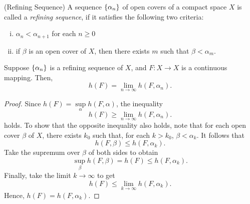 \documentclass[12pt,twoside,draft]{book}
\begin{document}
\begin{definition}
  (Refining Sequence)
  A sequence $\left \{ \alpha_n \right \}$ of open covers of a compact space $X$ is called a \textit{refining sequence}, if it satisfies the following two criteria:
  \begin{enumerate}[(i)]
    \item $\alpha_n < \alpha_{n+1}$ for each $n\geq 0$
    \item if $\beta$ is an open cover of $X$, then there exists $m$ such that $\beta < \alpha_m$.
  \end{enumerate}
\end{definition}

\begin{theorem}
  Suppose $\left \{ \alpha_n \right \}$ is a refining sequence of $X$, and $F:X\to X$ is a continuous mapping.
  Then,
  \begin{equation*}
    h(F) = \lim\limits_{n\to \infty} h(F, \alpha_n).
  \end{equation*}
  \label{thm:t-ent-ref-seq}
  \begin{proof}
    Since $h(F) = \sup\limits_{\alpha} h(F, \alpha)$, the inequality
    \begin{equation*}
      h(F) \geq \lim\limits_{n\to \infty} h(F, \alpha_n).
    \end{equation*}
    holds.
    To show that the opposite inequality also holds, note that for each open cover $\beta$ of $X$, there exists $k_0$ such that, for each $k > k_0$, $\beta < \alpha_k$.
    It follows that
    \begin{equation*}
      h(F, \beta) \leq h(F, \alpha_k).
    \end{equation*}
    Take the supremum over $\beta$ of both sides to obtain
    \begin{equation*}
      \sup\limits_{\beta} h(F, \beta) = h(F) \leq h(F, \alpha_k).
    \end{equation*}
    Finally, take the limit $k \to \infty$ to get
    \begin{equation*}
      h(F) \leq \lim\limits_{k \to \infty} h(F, \alpha_k).
    \end{equation*}
    Hence, $h(F) = h(F, \alpha_k)$.
  \end{proof}
\end{theorem}
\end{document}
